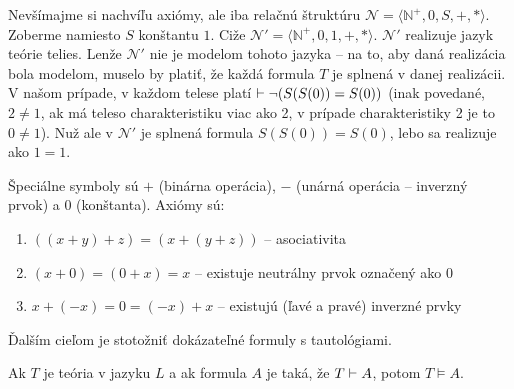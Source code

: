 \begin{poznamka}
    Nevšímajme si nachvíľu axiómy, ale iba relačnú štruktúru
    $\mathcal{N}=\langle \mathbb{N}^+,0,S,+,* \rangle$.
    Zoberme namiesto $S$ konštantu $1$.
    Ciže $\mathcal{N}'=\langle \mathbb{N}^+,0,1,+,* \rangle$.
    $\mathcal{N}'$ realizuje jazyk teórie telies.
    Lenže $\mathcal{N}'$ nie je modelom tohoto jazyka --
    na to, aby daná realizácia bola modelom, muselo by platiť, že
    každá formula $T$ je splnená v danej realizácii. V našom prípade,
    v každom telese platí $\vdash \neg (S(S(0))=S(0))$ (inak
    povedané, $2 \ne 1$, ak má teleso charakteristiku viac ako 2,
    v prípade charakteristiky 2 je to $0 \ne 1$). Nuž ale v 
    $\mathcal{N}'$ je splnená formula $S(S(0))=S(0)$, lebo sa
    realizuje ako $1=1$.
\end{poznamka}

\begin{priklad}
    Špeciálne symboly sú $+$ (binárna operácia), $-$ (unárná operácia
    -- inverzný prvok) a $0$ (konštanta).
    Axiómy sú:
    \begin{enumerate}
            \item $((x+y)+z) = (x+(y+z))$ -- asociativita
            \item $(x+0) = (0+x) = x$ -- existuje neutrálny prvok
            označený ako 0
            \item $x+(-x) = 0 = (-x)+x$ -- existujú (ľavé a pravé) inverzné
            prvky
    \end{enumerate}
\end{priklad}

Ďalším cieľom je stotožniť dokázateľné formuly s tautológiami.

\begin{veta}[O korektnosti]
    Ak $T$ je teória v jazyku $L$ a ak formula $A$ je taká,
    že $T \vdash A$, potom $T \models A$.
\end{veta}

